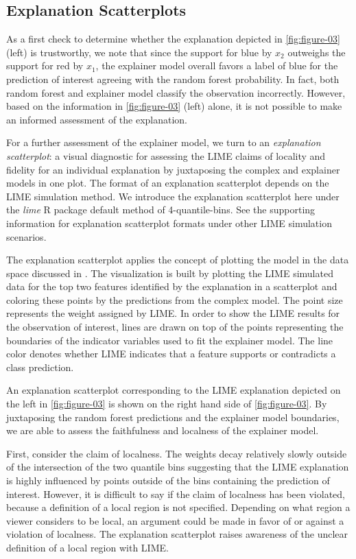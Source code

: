 \documentclass[AMS,STIX2COL]{WileyNJD-v2}\usepackage[]{graphicx}\usepackage[]{color}
\begin{document}
\subsection{Explanation Scatterplots} \label{exp-scatter}

As a first check to determine whether the explanation depicted in \autoref{fig:figure-03} (left) is trustworthy, we note that since the support for blue by $x_2$ outweighs the support for red by $x_1$, the explainer model overall favors a label of blue for the prediction of interest agreeing with the random forest probability. In fact, both random forest and explainer model classify the observation incorrectly. However, based on the information in \autoref{fig:figure-03} (left) alone, it is not possible to make an informed assessment of the explanation. 

For a further assessment of the explainer model, we turn to an \emph{explanation scatterplot}: a visual diagnostic for assessing the LIME claims of locality and fidelity for an individual explanation by juxtaposing the complex and explainer models in one plot. The format of an explanation scatterplot depends on the LIME simulation method. We introduce the explanation scatterplot here under the \emph{lime} R package default method of 4-quantile-bins. See the supporting information for explanation scatterplot formats under other LIME simulation scenarios.

The explanation scatterplot applies the concept of plotting the model in the data space discussed in \citet{wickham:2015}. The visualization is built by plotting the LIME simulated data for the top two features identified by the explanation in a scatterplot and coloring these points by the predictions from the complex model. The point size represents the weight assigned by LIME. In order to show the LIME results for the observation of interest, lines are drawn on top of the points representing the boundaries of the indicator variables used to fit the explainer model. The line color denotes whether LIME indicates that a feature supports or contradicts a class prediction. 

An explanation scatterplot corresponding to the LIME explanation depicted on the left in \autoref{fig:figure-03} is shown on the right hand side of \autoref{fig:figure-03}. By juxtaposing the random forest predictions and the explainer model boundaries, we are able to assess the faithfulness and localness of the explainer model. 

First, consider the claim of localness. The weights decay relatively slowly outside of the intersection of the two quantile bins suggesting that the LIME explanation is highly influenced by points outside of the bins containing the prediction of interest. However, it is difficult to say if the claim of localness has been violated, because a definition of a local region is not specified. Depending on what region a viewer considers to be local, an argument could be made in favor of or against a violation of localness. The explanation scatterplot raises awareness of the unclear definition of a local region with LIME. 
\end{document}
